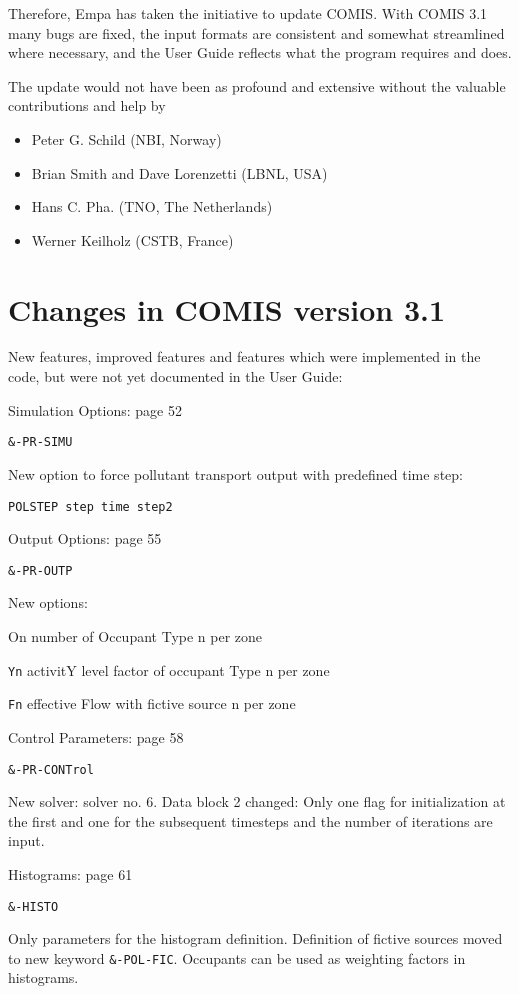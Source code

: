 \documentclass[10pt]{book}
\begin{document}
Therefore, Empa has taken the initiative to update COMIS. With COMIS 3.1 many bugs are fixed, the input formats are consistent and somewhat streamlined where necessary, and the User Guide reflects what the program requires and does.

The update would not have been as profound and extensive without the valuable contributions and help by

\begin{itemize}
\item Peter G. Schild (NBI, Norway)
\item Brian Smith and Dave Lorenzetti (LBNL, USA)
\item Hans C. Pha. (TNO, The Netherlands)
\item Werner Keilholz (CSTB, France)
\end{itemize}

\section{Changes in COMIS version 3.1}

New features, improved features and features which were implemented in the code, but were not yet documented in the User Guide:

Simulation Options: page 52

\verb|&-PR-SIMU|

New option to force pollutant transport output with predefined time step:

\verb|POLSTEP step time step2|

Output Options: page 55

\verb|&-PR-OUTP|

New options: 

On number of Occupant Type n per zone 

\verb|Yn| activitY level factor of occupant Type n per zone 

\verb|Fn| effective Flow with fictive source n per zone 

Control Parameters: page 58

\verb|&-PR-CONTrol|

New solver: solver no. 6. 
Data block 2 changed: Only one flag for initialization at the first and one for the subsequent timesteps and the number of iterations are input. 


Histograms: page 61

\verb|&-HISTO|

Only parameters for the histogram definition. Definition of fictive sources moved to new keyword \verb|&-POL-FIC|. Occupants can be used as weighting factors in histograms.
\end{document}

